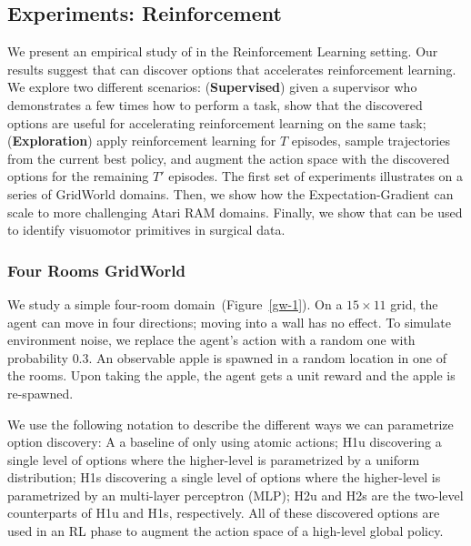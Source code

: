 \subsection{Experiments: Reinforcement}
We present an empirical study of \alg in the Reinforcement Learning setting. Our results suggest that \alg can discover options that accelerates reinforcement learning.
We explore two different scenarios: (\textbf{Supervised}) given a supervisor who demonstrates a few times how to perform a task, show that the discovered options are useful for accelerating reinforcement learning on the same task; (\textbf{Exploration}) apply reinforcement learning for $T$ episodes, sample trajectories from the current best policy, and augment the action space with the discovered options for the remaining $T'$ episodes. 
The first set of experiments illustrates \alg on a series of GridWorld domains.
Then, we show how the Expectation-Gradient can scale to more challenging Atari RAM domains.
Finally, we show that \alg can be used to identify visuomotor primitives in surgical data.

\subsubsection{Four Rooms GridWorld \label{exp:gw-four-rooms}}
We study a simple four-room domain~(Figure~\ref{gw-1}). On a $15\times11$ grid, the agent can move in four directions; moving into a wall has no effect. To simulate environment noise, we replace the agent's action with a random one with probability $0.3$. An observable apple is spawned in a random location in one of the rooms. Upon taking the apple, the agent gets a unit reward and the apple is re-spawned.

We use the following notation to describe the different ways we can parametrize option discovery: \textsf{A} a baseline of only using atomic actions; \textsf{H1u} discovering a single level of options where the higher-level is parametrized by a uniform distribution; \textsf{H1s} discovering a single level of options where the higher-level is parametrized by an multi-layer perceptron (MLP); \textsf{H2u} and \textsf{H2s} are the two-level counterparts of \textsf{H1u} and \textsf{H1s}, respectively. All of these discovered options are used in an RL phase to augment the action space of a high-level global policy.

